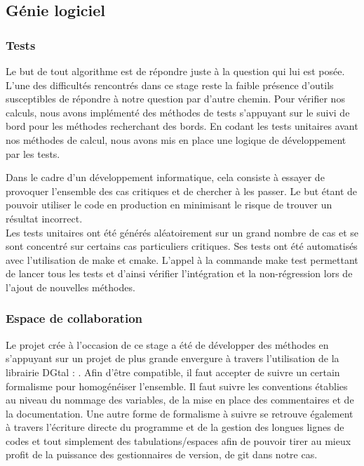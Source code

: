 \subsection{Génie logiciel}

\subsubsection{Tests}

Le but de tout algorithme est de répondre juste à la question qui lui est posée. L'une des difficultés rencontrés dans ce stage reste la faible présence d'outils susceptibles de répondre à notre question par d'autre chemin. Pour vérifier nos calculs, nous avons implémenté des méthodes de tests s'appuyant sur le suivi de bord pour les méthodes recherchant des bords. En codant les tests unitaires avant nos méthodes de calcul, nous avons mis en place une logique de développement par les tests. 

Dans le cadre d'un développement informatique, cela consiste à essayer de provoquer l'ensemble des cas critiques et de chercher à les passer. Le but étant de pouvoir utiliser le code en production en minimisant le risque de trouver un résultat incorrect.\\

Les tests unitaires ont été générés aléatoirement sur un grand nombre de cas et se sont concentré sur certains cas particuliers critiques. Ses tests ont été automatisés avec l'utilisation de make et cmake. L'appel à la commande make test permettant de lancer tous les tests et d'ainsi vérifier l'intégration et la non-régression lors de l'ajout de nouvelles méthodes. 


\subsubsection{Espace de collaboration}

Le projet crée à l'occasion de ce stage a été de développer des méthodes en s'appuyant sur un projet de plus grande envergure à travers l'utilisation de la librairie DGtal : \cite{DGtal}. Afin d'être compatible, il faut accepter de suivre un certain formalisme pour homogénéiser l'ensemble. Il faut suivre les conventions établies au niveau du nommage des variables, de la mise en place des commentaires et de la documentation. Une autre forme de formalisme à suivre se retrouve également à travers l'écriture directe du programme et de la gestion des longues lignes de codes et tout simplement des tabulations/espaces afin de pouvoir tirer au mieux profit de la puissance des gestionnaires de version, de git dans notre cas.\\

